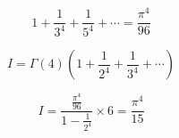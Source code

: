 \documentclass{beamer}
\begin{document}
\begin{CJK}{UTF8}{song}
\begin{frame}[allowframebreaks]
\begin{equation}
1+\frac{1}{3^{4}}+\frac{1}{5^{4}}+\cdots=\frac{\pi^{4}}{96}
\end{equation}

\begin{equation}
I=\Gamma(4)\left(1+\frac{1}{2^{4}}+\frac{1}{3^{4}}+\cdots\right)
\end{equation}

\begin{equation}
I=\frac{\frac{\pi^{4}}{96}}{1-\frac{1}{2^{4}}} \times 6=\frac{\pi^{4}}{15}
\end{equation}
\end{frame}

\end{CJK}
\end{document}
